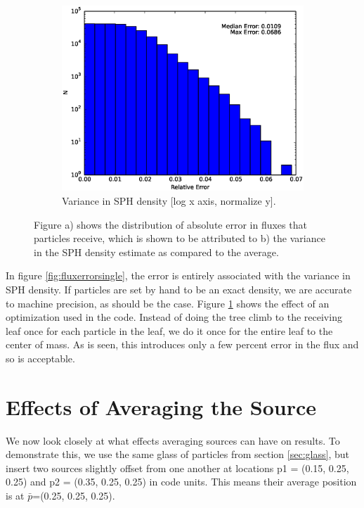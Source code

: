 \begin{figure}
\begin{subfigure}[b]{0.45\textwidth}
                \includegraphics[width=\textwidth]{graphics/errorOp.eps}
                \caption{Variance in SPH density [log x axis, normalize y].}
                \label{fig:optimization}
        \end{subfigure}
        \caption[Absolute flux error distribution and SPH density variance.]{Figure a) shows the distribution of absolute error in fluxes that particles receive, which is shown to be attributed to b) the variance in the SPH density estimate as compared to the average.}
        \label{fig:fluxdensityvariance}
\end{figure}

In figure \ref{fig:fluxerrorsingle}, the error is entirely associated with the variance in SPH density. If particles are set by hand to be an exact density, we are accurate to machine precision, as should be the case. Figure \ref{fig:optimization} shows the effect of an optimization used in the code. Instead of doing the tree climb to the receiving leaf once for each particle in the leaf, we do it once for the entire leaf to the center of mass. As is seen, this introduces only a few percent error in the flux and so is acceptable.

\section{Effects of Averaging the Source}
\label{sec:averagingsource}

We now look closely at what effects averaging sources can have on results. To demonstrate this, we use the same glass of particles from section \ref{sec:glass}, but insert two sources slightly offset from one another at locations p1 = (0.15, 0.25, 0.25) and p2 = (0.35, 0.25, 0.25) in code units. This means their average position is at $\bar{p}$=(0.25, 0.25, 0.25).

